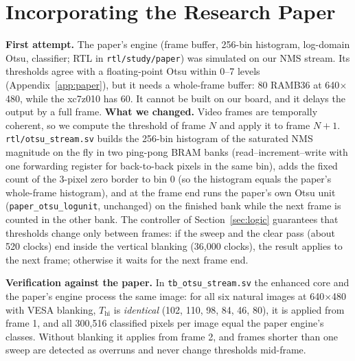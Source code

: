 \documentclass[11pt,a4paper]{article}
\begin{document}
\section{Incorporating the Research Paper}
\label{sec:paper}
\textbf{First attempt.} The paper's engine (frame buffer, 256-bin histogram, log-domain Otsu, classifier; RTL in
\texttt{rtl/study/paper}) was simulated on our NMS stream. Its thresholds agree with a floating-point Otsu within 0--7 levels
(Appendix~\ref{app:paper}), but it needs a whole-frame buffer: 80 RAMB36 at 640$\times$480, while the xc7z010 has 60. It cannot be
built on our board, and it delays the output by a full frame.
\textbf{What we changed.} Video frames are temporally coherent, so we compute the threshold of frame $N$ and apply it to frame $N{+}1$.
\texttt{rtl/otsu\_stream.sv} builds the 256-bin histogram of the saturated NMS magnitude on the fly in two ping-pong BRAM banks
(read--increment--write with one forwarding register for back-to-back pixels in the same bin), adds the fixed count of the 3-pixel
zero border to bin 0 (so the histogram equals the paper's whole-frame histogram), and at the frame end runs the paper's own Otsu unit
(\texttt{paper\_otsu\_logunit}, unchanged) on the finished bank while the next frame is counted in the other bank. The controller of
Section~\ref{sec:logic} guarantees that thresholds change only between frames: if the sweep and the clear pass (about 520 clocks)
end inside the vertical blanking (36{,}000 clocks), the result applies to the next frame; otherwise it waits for the next frame end.

\textbf{Verification against the paper.} In \texttt{tb\_otsu\_stream.sv} the enhanced core and the paper's engine process the same image:
for all six natural images at 640$\times$480 with VESA blanking, $T_\text{hi}$ is \emph{identical} (102, 110, 98, 84, 46, 80), it is
applied from frame 1, and all 300{,}516 classified pixels per image equal the paper engine's classes. Without blanking it applies
from frame 2, and frames shorter than one sweep are detected as overruns and never change thresholds mid-frame.
\end{document}
